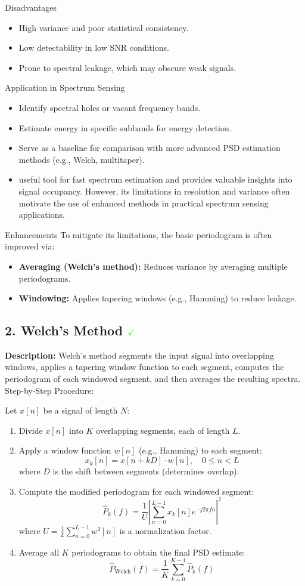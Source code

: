 \documentclass[10pt]{report}
\begin{document}
{Disadvantages}
\begin{itemize}
	\item High variance and poor statistical consistency.
	\item Low detectability in low SNR conditions.
	\item Prone to spectral leakage, which may obscure weak signals.
\end{itemize}

{Application in Spectrum Sensing}
\begin{itemize}
	\item Identify spectral holes or vacant frequency bands.
	\item Estimate energy in specific subbands for energy detection.
	\item Serve as a baseline for comparison with more advanced PSD estimation methods (e.g., Welch, multitaper).
	\item useful tool for fast spectrum estimation and provides valuable insights into signal occupancy. However, its limitations in resolution and variance often motivate the use of enhanced methods in practical spectrum sensing applications.
\end{itemize}

{Enhancements}
To mitigate its limitations, the basic periodogram is often improved via:
\begin{itemize}
	\item \textbf{Averaging (Welch's method):} Reduces variance by averaging multiple periodograms.
	\item \textbf{Windowing:} Applies tapering windows (e.g., Hamming) to reduce leakage.
\end{itemize}


\subsection*{2. Welch's Method $\color{green} {\checkmark}$}
\textbf{Description:} Welch's method segments the input signal into overlapping windows, applies a tapering window function to each segment, computes the periodogram of each windowed segment, and then averages the resulting spectra. {Step-by-Step Procedure}:

Let \( x[n] \) be a signal of length \( N \):
\begin{enumerate}
	\item Divide \( x[n] \) into \( K \) overlapping segments, each of length \( L \).
	\item Apply a window function \( w[n] \) (e.g., Hamming) to each segment:
	\[
	x_k[n] = x[n + kD] \cdot w[n], \quad 0 \leq n < L
	\]
	where \( D \) is the shift between segments (determines overlap).
	\item Compute the modified periodogram for each windowed segment:
	\[
	\hat{P}_k(f) = \frac{1}{U} \left| \sum_{n=0}^{L-1} x_k[n] e^{-j 2\pi f n} \right|^2
	\]
	where \( U = \frac{1}{L} \sum_{n=0}^{L-1} w^2[n] \) is a normalization factor.
	\item Average all \( K \) periodograms to obtain the final PSD estimate:
	\[
	\hat{P}_{\text{Welch}}(f) = \frac{1}{K} \sum_{k=0}^{K-1} \hat{P}_k(f)
	\]
\end{enumerate}
\end{document}
